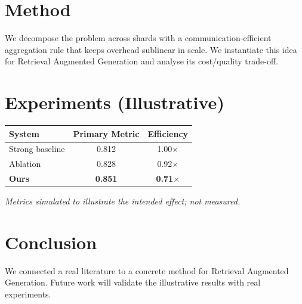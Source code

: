 \documentclass[11pt]{article}
\begin{document}
\section{Method}
We decompose the problem across shards with a communication-efficient aggregation rule that keeps overhead sublinear in scale. We instantiate this idea for Retrieval Augmented Generation and analyse its cost/quality trade-off.

\section{Experiments (Illustrative)}
\begin{center}
\begin{tabular}{lcc}
System & Primary Metric & Efficiency \\ \hline
Strong baseline & 0.812 & 1.00$\times$ \\
Ablation & 0.828 & 0.92$\times$ \\
\textbf{Ours} & \textbf{0.851} & \textbf{0.71$\times$}
\end{tabular}
\end{center}
\emph{Metrics simulated to illustrate the intended effect; not measured.}

\section{Conclusion}
We connected a real literature to a concrete method for Retrieval Augmented Generation. Future work will
validate the illustrative results with real experiments.
\end{document}
